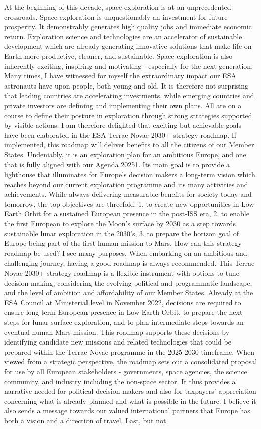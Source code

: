 \documentclass[12pt]{article}
\begin{document}
At the beginning of this decade, space exploration is at an unprecedented crossroads. Space exploration is unquestionably an investment for future prosperity. It demonstrably generates high quality jobs and immediate economic return. Exploration science and technologies are an accelerator of sustainable development which are already generating innovative solutions that make life on Earth more productive, cleaner, and sustainable. Space exploration is also inherently exciting, inspiring and motivating - especially for the next generation. Many times, I have witnessed for myself the extraordinary impact our ESA astronauts have upon people, both young and old. It is therefore not surprising that leading countries are accelerating investments, while emerging countries and private investors are defining and implementing their own plans. All are on a course to define their posture in exploration through strong strategies supported by visible actions. I am therefore delighted that exciting but achievable goals have been elaborated in the ESA Terrae Novae 2030+ strategy roadmap. If implemented, this roadmap will deliver benefits to all the citizens of our Member States. Undeniably, it is an exploration plan for an ambitious Europe, and one that is fully aligned with our Agenda 20251. Its main goal is to provide a lighthouse that illuminates for Europe’s decision makers a long-term vision which reaches beyond our current exploration programme and its many activities and achievements. While always delivering measurable benefits for society today and tomorrow, the top objectives are threefold: 1. to create new opportunities in Low Earth Orbit for a sustained European presence in the post-ISS era, 2. to enable the first European to explore the Moon’s surface by 2030 as a step towards sustainable lunar exploration in the 2030’s, 3. to prepare the horizon goal of Europe being part of the first human mission to Mars. How can this strategy roadmap be used? I see many purposes. When embarking on an ambitious and challenging journey, having a good roadmap is always recommended. This Terrae Novae 2030+ strategy roadmap is a flexible instrument with options to tune decision-making, considering the evolving political and programmatic landscape, and the level of ambition and affordability of our Member States. Already at the ESA Council at Ministerial level in November 2022, decisions are required to ensure long-term European presence in Low Earth Orbit, to prepare the next steps for lunar surface exploration, and to plan intermediate steps towards an eventual human Mars mission. This roadmap supports these decisions by identifying candidate new missions and related technologies that could be prepared within the Terrae Novae programme in the 2025-2030 timeframe. When viewed from a strategic perspective, the roadmap sets out a consolidated proposal for use by all European stakeholders - governments, space agencies, the science community, and industry including the non-space sector. It thus provides a narrative needed for political decision makers and also for taxpayers’ appreciation concerning what is already planned and what is possible in the future. I believe it also sends a message towards our valued international partners that Europe has both a vision and a direction of travel. Last, but not 
\end{document}
